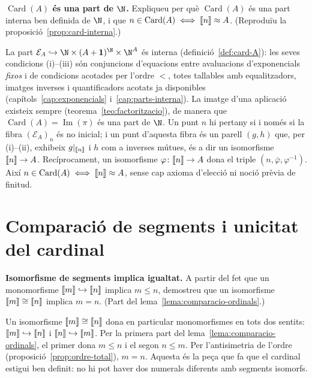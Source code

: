 \begin{exercici}
\textbf{\(\operatorname{Card}(A)\) és una part de \(\N\).} Expliqueu per què \(\operatorname{Card}(A)\) és una part interna ben definida de \(\N\), i que \(n\in\operatorname{Card}(A)\iff\llbracket n\rrbracket\approx A\). (Reproduïu la proposició~\ref{prop:card-interna}.)
\end{exercici}
\begin{solucio}
La part \(\mathcal E_A\hookrightarrow\N\times(A+\mathbf1)^{\N}\times\N^{A}\) és interna (definició~\ref{def:card-A}): les seves condicions (i)--(iii) són conjuncions d'equacions entre avaluacions d'exponencials \emph{fixos} i de condicions acotades per l'ordre \(<\), totes tallables amb equalitzadors, imatges inverses i quantificadors acotats ja disponibles (capítols~\ref{cap:exponencials} i~\ref{cap:parts-interna}). La imatge d'una aplicació existeix sempre (teorema~\ref{teo:factoritzacio}), de manera que \(\operatorname{Card}(A)=\operatorname{Im}(\pi)\) és una part de \(\N\). Un punt \(n\) hi pertany si i només si la fibra \((\mathcal E_A)_n\) és no inicial; i un punt d'aquesta fibra és un parell \((g,h)\) que, per (i)--(ii), exhibeix \(g|_{\llbracket n\rrbracket}\) i \(h\) com a inverses mútues, és a dir un isomorfisme \(\llbracket n\rrbracket\to A\). Recíprocament, un isomorfisme \(\varphi\colon\llbracket n\rrbracket\to A\) dona el triple \((n,\bar\varphi,\varphi^{-1})\). Així \(n\in\operatorname{Card}(A)\iff\llbracket n\rrbracket\approx A\), sense cap axioma d'elecció ni noció prèvia de finitud.
\end{solucio}

\section{Comparació de segments i unicitat del cardinal}\label{prac:comparacio}

\begin{exercici}
\textbf{Isomorfisme de segments implica igualtat.} A partir del fet que un monomorfisme \(\llbracket m\rrbracket\hookrightarrow\llbracket n\rrbracket\) implica \(m\le n\), demostreu que un isomorfisme \(\llbracket m\rrbracket\cong\llbracket n\rrbracket\) implica \(m=n\). (Part del lema~\ref{lema:comparacio-ordinals}.)
\end{exercici}
\begin{solucio}
Un isomorfisme \(\llbracket m\rrbracket\cong\llbracket n\rrbracket\) dona en particular monomorfismes en tots dos sentits: \(\llbracket m\rrbracket\hookrightarrow\llbracket n\rrbracket\) i \(\llbracket n\rrbracket\hookrightarrow\llbracket m\rrbracket\). Per la primera part del lema~\ref{lema:comparacio-ordinals}, el primer dona \(m\le n\) i el segon \(n\le m\). Per l'antisimetria de l'ordre (proposició~\ref{prop:ordre-total}), \(m=n\). Aquesta és la peça que fa que el cardinal estigui ben definit: no hi pot haver dos numerals diferents amb segments isomorfs.
\end{solucio}

